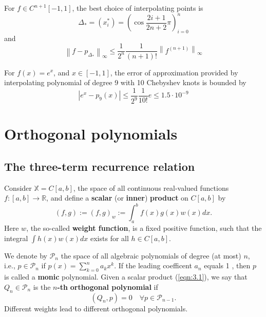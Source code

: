 \documentclass[a4paper]{article}
\begin{document}
\begin{theorem}
    For $f \in C^{n+1}[-1,1]$, the best choice of interpolating points is 
    \[
        \Delta_*=\left(x_i^*\right)=\left(\cos \frac{2 i+1}{2 n+2} \pi\right)_{i=0}^n
    \]
    and
    \[
    \left\|f-p_{\Delta_*}\right\|_{\infty} \leq \frac{1}{2^n} \frac{1}{(n+1) !}\left\|f^{(n+1)}\right\|_{\infty}
    \]
\end{theorem}

\begin{example}
    For $f(x)=e^x$, and $x \in[-1,1]$, the error of approximation provided by interpolating polynomial of degree 9 with 10 Chebyshev knots is bounded by
    \[
    \left|e^x-p_9(x)\right| \leq \frac{1}{2^9} \frac{1}{10 !} e \leq 1.5 \cdot 10^{-9}
    \]
\end{example}

\section{Orthogonal polynomials}
\subsection{The three-term recurrence relation}
Consider $\mathbb{X}=C[a, b]$, the space of all continuous real-valued functions $f:[a, b] \rightarrow \mathbb{R}$, and define a \textbf{scalar} (or \textbf{inner}) \textbf{product} on $C[a, b]$ by
\begin{equation}\label{eqn:3.1}
    (f, g):=(f, g)_w:=\int_a^b f(x) g(x) w(x) d x .
\end{equation}
Here $w$, the so-called \textbf{weight function}, is a fixed positive function, such that the integral $\int h(x) w(x) d x$ exists for all $h \in C[a, b]$.

We denote by $\mathcal{P}_n$ the space of all algebraic polynomials of degree (at most) $n$, i.e., $p \in \mathcal{P}_n$ if $p(x)=\sum_{k=0}^n a_k x^k$. If the leading coefficent $a_n$ equals 1 , then $p$ is called a \textbf{monic} polynomial. Given a scalar product (\ref{eqn:3.1}), we say that $Q_n \in \mathcal{P}_n$ is the $n$\textbf{-th} \textbf{orthogonal polynomial} if
\[
\left(Q_n, p\right)=0 \quad \forall p \in \mathcal{P}_{n-1} .
\]
Different weights lead to different orthogonal polynomials.
\end{document}
